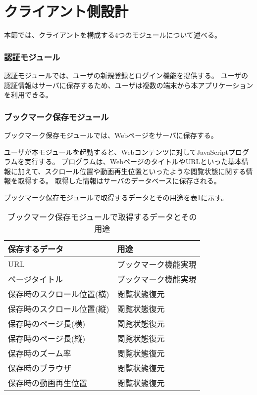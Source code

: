 \section{クライアント側設計}
本節では、クライアントを構成する4つのモジュールについて述べる。

\subsubsection{認証モジュール}
認証モジュールでは、ユーザの新規登録とログイン機能を提供する。
ユーザの認証情報はサーバに保存するため、ユーザは複数の端末から本アプリケーションを利用できる。

\subsubsection{ブックマーク保存モジュール}
ブックマーク保存モジュールでは、Webページをサーバに保存する。

ユーザが本モジュールを起動すると、Webコンテンツに対してJavaScriptプログラムを実行する。
プログラムは、WebページのタイトルやURLといった基本情報に加えて、スクロール位置や動画再生位置といったような閲覧状態に関する情報を取得する。
取得した情報はサーバのデータベースに保存される。

ブックマーク保存モジュールで取得するデータとその用途を表\ref{tb:design-save-bookmark-data-usage}に示す。

\begin{table}[htbp]
  \label{tb:design-save-bookmark-data-usage}
  \caption{ブックマーク保存モジュールで取得するデータとその用途}
  \begin{center}
    \begin{tabular}{|l|l|}
      \hline
      保存するデータ & 用途 \\\hline\hline
      URL & ブックマーク機能実現 \\\hline
      ページタイトル & ブックマーク機能実現 \\\hline
      保存時のスクロール位置(横) & 閲覧状態復元 \\\hline
      保存時のスクロール位置(縦) & 閲覧状態復元 \\\hline
      保存時のページ長(横) & 閲覧状態復元 \\\hline
      保存時のページ長(縦) & 閲覧状態復元 \\\hline
      保存時のズーム率 & 閲覧状態復元 \\\hline
      保存時のブラウザ & 閲覧状態復元 \\\hline
      保存時の動画再生位置 & 閲覧状態復元 \\\hline
    \end{tabular}
  \end{center}
\end{table}

